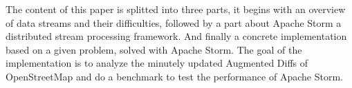 The content of this paper is splitted into three parts, it begins with an overview of data streams and their difficulties,
followed by a part about Apache Storm a distributed stream processing framework.
And finally a concrete implementation based on a given problem, solved with Apache Storm.
The goal of the implementation is to analyze the minutely updated Augmented Diffs of OpenStreetMap
and do a benchmark to test the performance of Apache Storm.
